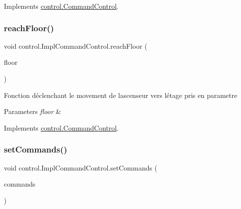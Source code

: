 Implements \mbox{\hyperlink{interfacecontrol_1_1_command_control_abfefcf986aceb87768275e04df3653f5}{control.\+Command\+Control}}.

\mbox{\label{classcontrol_1_1_impl_command_control_a5736ac91cdc39805dc27c6af0c9935cb}} 
\subsubsection{\texorpdfstring{reachFloor()}{reachFloor()}}
{\footnotesize\ttfamily void control.\+Impl\+Command\+Control.\+reach\+Floor (\begin{DoxyParamCaption}\item[{int}]{floor }\end{DoxyParamCaption})}

Fonction déclenchant le movement de l\textquotesingle{}ascenseur vers l\textquotesingle{}étage pris en parametre 
\begin{DoxyParams}{Parameters}
{\em floor} & \\
\hline
\end{DoxyParams}


Implements \mbox{\hyperlink{interfacecontrol_1_1_command_control_aed88af210353f0e854d6da8af1089851}{control.\+Command\+Control}}.

\mbox{\label{classcontrol_1_1_impl_command_control_a4a32b15e589ca6ad5be4d6288f73d0d6}} 
\subsubsection{\texorpdfstring{setCommands()}{setCommands()}}
{\footnotesize\ttfamily void control.\+Impl\+Command\+Control.\+set\+Commands (\begin{DoxyParamCaption}\item[{Navigable\+Set$<$ \mbox{\hyperlink{classcontrol_1_1command_1_1_floor_request}{Floor\+Request}} $>$}]{commands }\end{DoxyParamCaption})}

\mbox{\label{classcontrol_1_1_impl_command_control_a122541d8e0d77a6d9ef62a1ee5391ee9}} 
